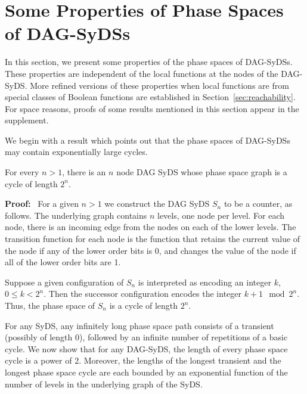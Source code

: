 \section{Some Properties of Phase Spaces of DAG-SyDSs}
\label{sec:bounded-levels}

In this section, we present some properties of the
phase spaces of DAG-SyDSs.
These properties are independent of the local functions
at the nodes of the DAG-SyDS.
More refined versions of these properties when local
functions are from special classes of Boolean functions
are established in Section~\ref{sec:reachability}. 
For space reasons, proofs of some results mentioned
in this section appear in the supplement.

We begin with a result which points out that the phase spaces
of DAG-SyDSs may contain exponentially large cycles.

\smallskip
\begin{proposition}\label{pro:long_phase_space_cycle}
For every $n  > 1$, there is an $n$ node DAG SyDS 
whose phase space graph is a cycle of length $2^n$.
\end{proposition}

\noindent
\textbf{Proof:}~ 
For a given $n > 1$ we construct the DAG SyDS $S_n$ to be a counter, as follows.
The underlying graph contains $n$ levels, one node per level. 
For each node, there is an incoming edge from the nodes on each of the lower levels.
The transition function for each node is the function 
that retains the current value of the node if any of the lower order bits is 0,
and changes the value of the node if all of the lower order bits are 1.

Suppose a given configuration of $S_n$ is interpreted as encoding
an integer $k$, $0 \leq k < 2^n$.  Then the successor configuration
encodes the integer $k + 1 \mod 2^n$.  Thus, the phase space of
$S_n$ is a cycle of length $2^n$.  \QED

For any SyDS, any infinitely long phase space path consists of a
transient (possibly of length 0), followed by an infinite number
of repetitions of a basic cycle.  We now show that for any 
DAG-SyDS, the length of every phase space cycle is a power of 2.
Moreover, the lengths of the longest transient and the longest phase
space cycle are each bounded by an exponential function of the
number of levels in the underlying graph of the SyDS.

